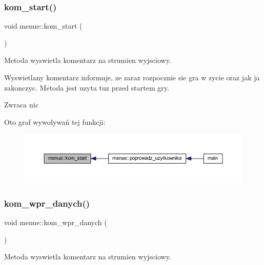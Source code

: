 \subsubsection{\texorpdfstring{kom\+\_\+start()}{kom\_start()}}
{\footnotesize\ttfamily void menue\+::kom\+\_\+start (\begin{DoxyParamCaption}{ }\end{DoxyParamCaption})\hspace{0.3cm}{\ttfamily [static]}}

Metoda wyswietla komentarz na strumien wyjsciowy.

Wyswietlany komentarz informuje, ze zaraz rozpocznie sie gra w zycie oraz jak ja zakonczyc. Metoda jest uzyta tuz przed startem gry. \begin{DoxyReturn}{Zwraca}
nic 
\end{DoxyReturn}
Oto graf wywoływań tej funkcji\+:
\nopagebreak
\begin{figure}[H]
\begin{center}
\leavevmode
\includegraphics[width=350pt]{classmenue_a3d62c66c619cbd4ae2fea6dc5a96ec51_icgraph}
\end{center}
\end{figure}
\mbox{\label{classmenue_a799c1d6893e274fc84d5fc83229e740a}} 
\subsubsection{\texorpdfstring{kom\+\_\+wpr\+\_\+danych()}{kom\_wpr\_danych()}}
{\footnotesize\ttfamily void menue\+::kom\+\_\+wpr\+\_\+danych (\begin{DoxyParamCaption}{ }\end{DoxyParamCaption})\hspace{0.3cm}{\ttfamily [static]}}

Metoda wyswietla komentarz na strumien wyjsciowy.

